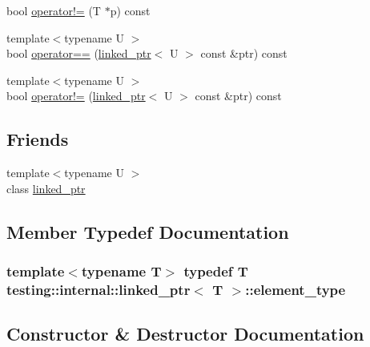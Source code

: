 \begin{DoxyCompactItemize}
\item 
bool \hyperlink{classtesting_1_1internal_1_1linked__ptr_a3685f9661bbe410cfa58fea2f14396b7}{operator!=} (T $\ast$p) const 
\item 
{\footnotesize template$<$typename U $>$ }\\bool \hyperlink{classtesting_1_1internal_1_1linked__ptr_a3b46c9ecfd928673a524dcb3c70fd2ad}{operator==} (\hyperlink{classtesting_1_1internal_1_1linked__ptr}{linked\+\_\+ptr}$<$ U $>$ const \&ptr) const 
\item 
{\footnotesize template$<$typename U $>$ }\\bool \hyperlink{classtesting_1_1internal_1_1linked__ptr_a6449584b90a09a313300599fb3a23633}{operator!=} (\hyperlink{classtesting_1_1internal_1_1linked__ptr}{linked\+\_\+ptr}$<$ U $>$ const \&ptr) const 
\end{DoxyCompactItemize}
\subsection*{Friends}
\begin{DoxyCompactItemize}
\item 
{\footnotesize template$<$typename U $>$ }\\class \hyperlink{classtesting_1_1internal_1_1linked__ptr_a7763f286ca03a7f7363a033d996c8c1c}{linked\+\_\+ptr}
\end{DoxyCompactItemize}


\subsection{Member Typedef Documentation}
\subsubsection[{\texorpdfstring{element\+\_\+type}{element_type}}]{\setlength{\rightskip}{0pt plus 5cm}template$<$typename T$>$ typedef T {\bf testing\+::internal\+::linked\+\_\+ptr}$<$ T $>$\+::{\bf element\+\_\+type}}\hypertarget{classtesting_1_1internal_1_1linked__ptr_a295c7d1ee4100d916514c4e4385a0063}{}\label{classtesting_1_1internal_1_1linked__ptr_a295c7d1ee4100d916514c4e4385a0063}


\subsection{Constructor \& Destructor Documentation}
